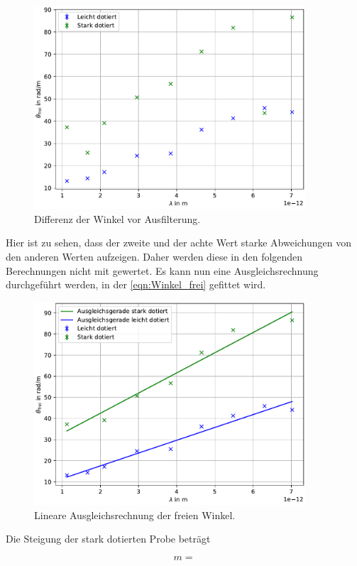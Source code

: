 \begin{figure}[H]
    \centering
    \includegraphics[width=0.9\textwidth]{../Rohplot.pdf}
    \caption{Differenz der Winkel vor Ausfilterung.}
    \label{fig:pre}
\end{figure}

\noindent Hier ist zu sehen, dass der zweite und der achte Wert starke Abweichungen von den anderen Werten 
aufzeigen. Daher werden diese in den folgenden Berechnungen nicht mit gewertet. Es kann nun eine Ausgleichsrechnung 
durchgeführt werden, in der \autoref{eqn:Winkel_frei} gefittet wird. 

\begin{figure}[H]
    \centering
    \includegraphics[width=0.9\textwidth]{../LinRegress.pdf}
    \caption{Lineare Ausgleichsrechnung der freien Winkel.}
    \label{fig:LinRegress}
\end{figure}

\noindent Die Steigung der stark dotierten Probe beträgt 

\begin{equation}
    m=
\end{equation}




